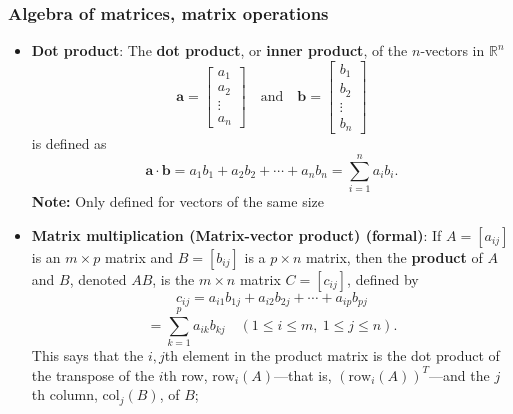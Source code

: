 \documentclass{report}
\begin{document}
    \subsubsection{Algebra of matrices, matrix operations}
    \begin{itemize}
                    \item \textbf{Dot product}:
                The \textbf{dot product}, or \textbf{inner product}, of the $n$-vectors in $\mathbb{R}^n$ 
                \[
                    \mathbf{a} = \begin{bmatrix}
                        a_1 \\
                        a_2 \\
                        \vdots \\
                        a_n
                    \end{bmatrix}
                    \quad \text{and} \quad
                    \mathbf{b} = \begin{bmatrix}
                        b_1 \\
                        b_2 \\
                        \vdots \\
                        b_n
                    \end{bmatrix}
                \]
                is defined as
                \[
                    \mathbf{a} \cdot \mathbf{b} = a_1b_1 + a_2b_2 + \cdots + a_nb_n = \sum_{i=1}^{n} a_i b_i.
                \]
                \bigbreak \noindent 
                \textbf{Note:} Only defined for vectors of the same size
            \item \textbf{Matrix multiplication (Matrix-vector product) (formal)}:
                If $A = [a_{ij}]$ is an $m \times p$ matrix and $B = [b_{ij}]$ is a $p \times n$ matrix, then the \textbf{product} of $A$ and $B$, denoted $AB$, is the $m \times n$ matrix $C = [c_{ij}]$, defined by
                \[
                    c_{ij} = a_{i1}b_{1j} + a_{i2}b_{2j} + \cdots + a_{ip}b_{pj}
                \]
                \[
                    = \sum_{k=1}^{p} a_{ik}b_{kj} \quad (1 \leq i \leq m, \ 1 \leq j \leq n).
                \]
                \bigbreak \noindent 
                This says that the \(i,j\)th element in the product matrix is the dot product of the transpose of the \(i\)th row, \(\text{row}_i(A)\)—that is, \((\text{row}_i(A))^T\)—and the \(j\)th column, \(\text{col}_j(B)\), of \(B\); 
                \bigbreak \noindent 

\end{itemize}
\end{document}
